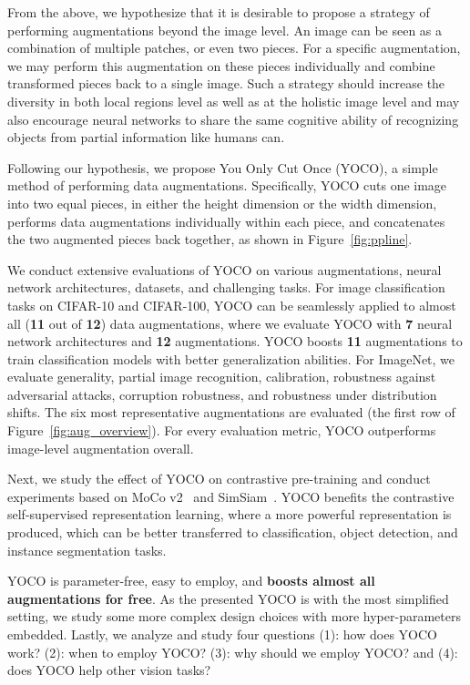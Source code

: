 \documentclass{article}
\begin{document}
From the above, we hypothesize that it is desirable to propose a strategy of performing augmentations beyond the image level. An image can be seen as a combination of multiple patches, or even two pieces. For a specific augmentation, we may perform this augmentation on these pieces individually and combine transformed pieces back to a single image. Such a strategy should increase the diversity in both local regions level as well as at the holistic image level and may also encourage neural networks to share the same cognitive ability of recognizing objects from partial information like humans can.

Following our hypothesis, we propose You Only Cut Once (YOCO), a simple method of performing data augmentations. Specifically, YOCO cuts one image into two equal pieces, in either the height dimension or the width dimension, performs data augmentations individually within each piece, and concatenates the two augmented pieces back together, as shown in Figure~\ref{fig:ppline}.

We conduct extensive evaluations of YOCO on various augmentations, neural network architectures, datasets, and challenging tasks. For image classification tasks on CIFAR-10 and CIFAR-100, YOCO can be seamlessly applied to almost all (\textbf{11} out of \textbf{12}) data augmentations, where we evaluate YOCO with \textbf{7} neural network architectures and \textbf{12} augmentations. YOCO boosts\textbf{ 11 }augmentations to train classification models with better generalization abilities. 
For ImageNet, we evaluate generality, partial image recognition, calibration, robustness against adversarial attacks, corruption robustness, and robustness under distribution shifts. The six most representative augmentations are evaluated (the first row of Figure~\ref{fig:aug_overview}). For every evaluation metric, YOCO outperforms image-level augmentation overall.

Next, we study the effect of YOCO on contrastive pre-training
and conduct experiments based on MoCo v2~\cite{chen2020improved} and SimSiam~\cite{chen2021exploring}. 
YOCO benefits the contrastive self-supervised representation learning, where a more powerful representation is produced, which can be better transferred to classification, object detection, and instance segmentation tasks. 

YOCO is parameter-free, easy to employ, and \textbf{boosts almost all augmentations for free}. As the presented YOCO is with the most simplified setting, we study some more complex design choices with more hyper-parameters embedded. Lastly, we analyze and study four questions (1): how does YOCO work? (2): when to employ YOCO? (3): why should we employ YOCO? and (4): does YOCO help other vision tasks?
\end{document}
